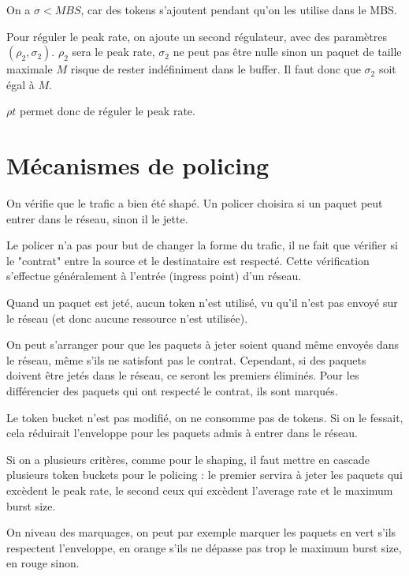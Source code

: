 			On a $\sigma < MBS$, car des tokens s'ajoutent pendant qu'on les utilise dans le MBS.
			
			
			Pour réguler le peak rate, on ajoute un second régulateur, avec des paramètres $(\rho_2, \sigma_2)$. $\rho_2$ sera le peak rate, $\sigma_2$ ne peut pas être nulle sinon un paquet de taille maximale $M$ risque de rester indéfiniment dans le buffer. Il faut donc que $\sigma_2$ soit égal à $M$.
			
			$\rho t$ permet donc de réguler le peak rate.			
		
			
		\section{Mécanismes de policing}
		
		On vérifie que le trafic a bien été shapé. Un policer choisira si un paquet peut entrer dans le réseau, sinon il le jette.
		
		Le policer n'a pas pour but de changer la forme du trafic, il ne fait que vérifier si le "contrat" entre la source et le destinataire est respecté. Cette vérification s'effectue généralement à l'entrée (ingress point) d'un réseau.
		
		
		Quand un paquet est jeté, aucun token n'est utilisé, vu qu'il n'est pas envoyé sur le réseau (et donc aucune ressource n'est utilisée).
				
		On peut s'arranger pour que les paquets à jeter soient quand même envoyés dans le réseau, même s'ils ne satisfont pas le contrat. Cependant, si des paquets doivent être jetés dans le réseau, ce seront les premiers éliminés. Pour les différencier des paquets qui ont respecté le contrat, ils sont marqués.
		
		Le token bucket n'est pas modifié, on ne consomme pas de tokens. Si on le fessait, cela réduirait l'enveloppe pour les paquets admis à entrer dans le réseau.
		
		Si on a plusieurs critères, comme pour le shaping, il faut mettre en cascade plusieurs token buckets pour le policing : le premier servira à jeter les paquets qui excèdent le peak rate, le second ceux qui excèdent l'average rate et le maximum burst size.
		
		On niveau des marquages, on peut par exemple marquer les paquets en vert s'ils respectent l'enveloppe, en orange s'ils ne dépasse pas trop le maximum burst size, en rouge sinon.
		
		